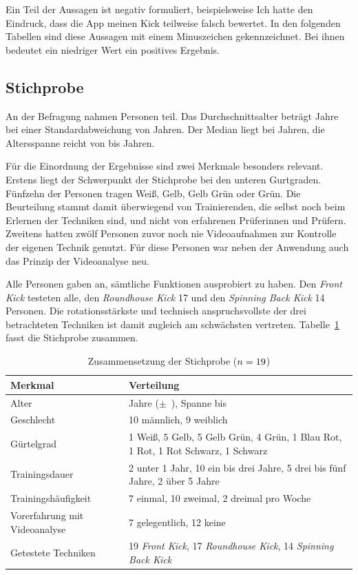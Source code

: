 \documentclass[intern]{cgMA}
\begin{document}
Ein Teil der Aussagen ist negativ formuliert, beispielsweise \glqq{}Ich hatte den Eindruck, dass die App meinen Kick teilweise falsch bewertet\grqq{}. In den folgenden Tabellen sind diese Aussagen mit einem Minuszeichen gekennzeichnet. Bei ihnen bedeutet ein niedriger Wert ein positives Ergebnis.

\subsection{Stichprobe}
\label{sec:eval_stichprobe}
An der Befragung nahmen \Nteiln{} Personen teil. Das Durchschnittsalter beträgt \AlterMittel{} Jahre bei einer Standardabweichung von \AlterSD{} Jahren. Der Median liegt bei \AlterMedian{} Jahren, die Altersspanne reicht von \AlterMin{} bis \AlterMax{} Jahren.

Für die Einordnung der Ergebnisse sind zwei Merkmale besonders relevant. Erstens liegt der Schwerpunkt der Stichprobe bei den unteren Gurtgraden. Fünfzehn der \Nteiln{} Personen tragen Weiß, Gelb, Gelb Grün oder Grün. Die Beurteilung stammt damit überwiegend von Trainierenden, die selbst noch beim Erlernen der Techniken sind, und nicht von erfahrenen Prüferinnen und Prüfern. Zweitens hatten zwölf Personen zuvor noch nie Videoaufnahmen zur Kontrolle der eigenen Technik genutzt. Für diese Personen war neben der Anwendung auch das Prinzip der Videoanalyse neu.

Alle \Nteiln{} Personen gaben an, sämtliche Funktionen ausprobiert zu haben. Den \textit{Front Kick} testeten alle, den \textit{Roundhouse Kick} 17 und den \textit{Spinning Back Kick} 14 Personen. Die rotationsstärkste und technisch anspruchsvollste der drei betrachteten Techniken ist damit zugleich am schwächsten vertreten. Tabelle~\ref{tab:eval_stichprobe} fasst die Stichprobe zusammen.

\begin{table}[htbp]
\centering
\small
\begin{tabular}{p{} p{}}
\hline
\textbf{Merkmal} & \textbf{Verteilung} \\ \hline
Alter & \AlterMittel{} Jahre ($\pm$~\AlterSD{}), Spanne \AlterMin{} bis \AlterMax{} \\
Geschlecht & 10 männlich, 9 weiblich \\
Gürtelgrad & 1 Weiß, 5 Gelb, 5 Gelb Grün, 4 Grün, 1 Blau Rot, 1 Rot, 1 Rot Schwarz, 1 Schwarz \\
Trainingsdauer & 2 unter 1 Jahr, 10 ein bis drei Jahre, 5 drei bis fünf Jahre, 2 über 5 Jahre \\
Trainingshäufigkeit & 7 einmal, 10 zweimal, 2 dreimal pro Woche \\
Vorerfahrung mit Videoanalyse & 7 gelegentlich, 12 keine \\
Getestete Techniken & 19 \textit{Front Kick}, 17 \textit{Roundhouse Kick}, 14 \textit{Spinning Back Kick} \\ \hline
\end{tabular}
\caption{Zusammensetzung der Stichprobe ($n=19$)}
\label{tab:eval_stichprobe}
\end{table}
\end{document}
